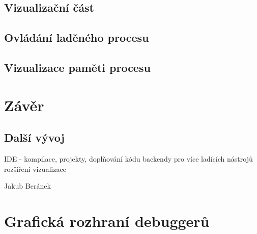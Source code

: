 \documentclass[bc,male,python,dept460]{diploma}						%
\begin{document}
	\subsection{Vizualizační část}
	
	\subsection{Ovládání laděného procesu}
	\subsection{Vizualizace paměti procesu}

\section{Závěr}
\label{sec:Conclusion}
\subsection{Další vývoj}
IDE - kompilace, projekty, doplňování kódu
backendy pro více ladících nástrojů
rozšíření vizualizace


\bigskip
\begin{flushright}
Jakub Beránek
\end{flushright}

\printbibheading[title=Zdroje, heading=bibintoc]
\printbibliography

\appendix
\section{Grafická rozhraní debuggerů}
\label{appendix:gui}


\clearpage
\end{document}
